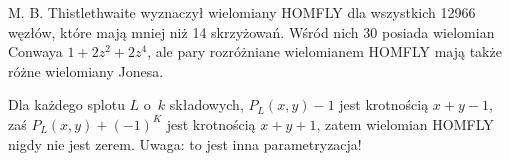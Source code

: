 M. B. Thistlethwaite wyznaczył wielomiany HOMFLY dla wszystkich 12966 węzłów, które mają mniej niż 14 skrzyżowań.
Wśród nich 30 posiada wielomian Conwaya $1 + 2z^2 + 2z^4$, ale pary rozróżniane wielomianem HOMFLY mają także różne wielomiany Jonesa.



Dla każdego splotu $L$ o~$k$ składowych, $P_L(x,y) - 1$ jest krotnością $x+y-1$, zaś $P_L(x,y) + (-1)^K$ jest krotnością $x +y + 1$, zatem wielomian HOMFLY nigdy nie jest zerem.
Uwaga: to jest inna parametryzacja!

